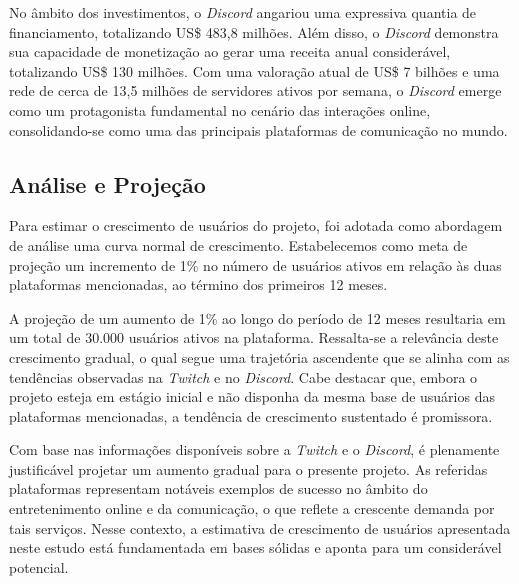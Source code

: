 No âmbito dos investimentos, o \textit{\gls{Discord}} angariou uma expressiva quantia de financiamento, totalizando US\$ 483,8 milhões. Além disso, o \textit{\gls{Discord}} demonstra sua capacidade de monetização ao gerar uma receita anual considerável, totalizando US\$ 130 milhões. Com uma valoração atual de US\$ 7 bilhões e uma rede de cerca de 13,5 milhões de servidores ativos por semana, o \textit{\gls{Discord}} emerge como um protagonista fundamental no cenário das interações online, consolidando-se como uma das principais plataformas de comunicação no mundo.

\subsection{Análise e Projeção}

Para estimar o crescimento de usuários do projeto, foi adotada como abordagem de análise uma curva normal de crescimento. Estabelecemos como meta de projeção um incremento de 1\% no número de usuários ativos em relação às duas plataformas mencionadas, ao término dos primeiros 12 meses.

A projeção de um aumento de 1\% ao longo do período de 12 meses resultaria em um total de 30.000 usuários ativos na plataforma. Ressalta-se a relevância deste crescimento gradual, o qual segue uma trajetória ascendente que se alinha com as tendências observadas na \textit{\gls{Twitch}} e no \textit{\gls{Discord}}. Cabe destacar que, embora o projeto esteja em estágio inicial e não disponha da mesma base de usuários das plataformas mencionadas, a tendência de crescimento sustentado é promissora.

Com base nas informações disponíveis sobre a \textit{\gls{Twitch}} e o \textit{\gls{Discord}}, é plenamente justificável projetar um aumento gradual para o presente projeto. As referidas plataformas representam notáveis exemplos de sucesso no âmbito do entretenimento online e da comunicação, o que reflete a crescente demanda por tais serviços. Nesse contexto, a estimativa de crescimento de usuários apresentada neste estudo está fundamentada em bases sólidas e aponta para um considerável potencial.